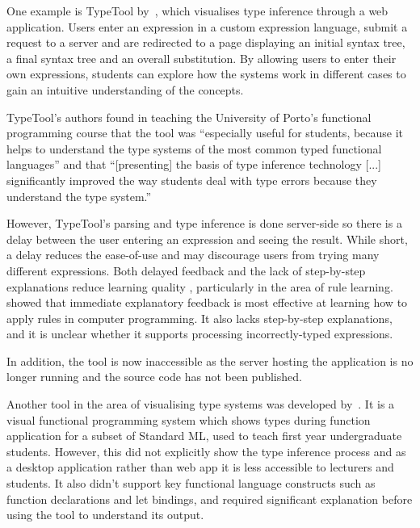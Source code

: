 \documentclass[a4paper,fleqn,twoside,12pt]{report}
\begin{document}
One example is TypeTool by~\cite{ref4}, which visualises type inference through a web application. Users enter an expression in a custom expression language, submit a request to a server and are redirected to a page displaying an initial syntax tree, a final syntax tree and an overall substitution. By allowing users to enter their own expressions, students can explore how the systems work in different cases to gain an intuitive understanding of the concepts.

TypeTool’s authors found in teaching the University of Porto’s functional programming course that the tool was “especially useful for students, because it helps to understand the type systems of the most common typed functional languages” and that “[presenting] the basis of type inference technology [...] significantly improved the way students deal with type errors because they understand the type system.”

However, TypeTool’s parsing and type inference is done server-side so there is a delay between the user entering an expression and seeing the result. While short, a delay reduces the ease-of-use and may discourage users from trying many different expressions. Both delayed feedback and the lack of step-by-step explanations reduce learning quality \citep{ref5}, particularly in the area of rule learning.~\cite{ref6} showed that immediate explanatory feedback is most effective at learning how to apply rules in computer programming. It also lacks step-by-step explanations, and it is unclear whether it supports processing incorrectly-typed expressions.

In addition, the tool is now inaccessible as the server hosting the application is no longer running and the source code has not been published.

Another tool in the area of visualising type systems was developed by~\cite{ref7}. It is a visual functional programming system which shows types during function application for a subset of Standard ML, used to teach first year undergraduate students. However, this did not explicitly show the type inference process and as a desktop application rather than web app it is less accessible to lecturers and students. It also didn’t support key functional language constructs such as function declarations and let bindings, and required significant explanation before using the tool to understand its output.
\end{document}
